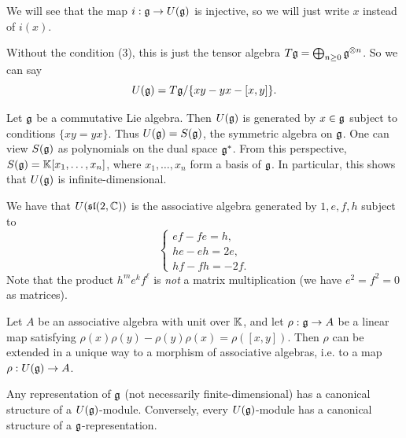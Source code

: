 \begin{remark}
  We will see that the map
  $i : \mathfrak{g} \to U(\mathfrak{g})$ is injective, so
  we will just write $x$ instead of $i(x)$.
\end{remark}

\begin{remark}
  Without the condition (3), this is just
  the tensor algebra
  $T \mathfrak{g} = \bigoplus_{n \ge 0} \mathfrak{g}^{\otimes n}$.
  So we can say
  \[
    U(\mathfrak{g}) = T \mathfrak{g} / \{xy - yx - [x, y]\}.
  \]
\end{remark}

\begin{example}
  Let $\mathfrak{g}$ be a commutative Lie algebra.
  Then $U(\mathfrak{g})$ is generated by $x \in \mathfrak{g}$
  subject to conditions
  $\{xy = yx\}$. Thus $U(\mathfrak{g}) = S(\mathfrak{g})$, the
  symmetric algebra on $\mathfrak{g}$. One can view $S(\mathfrak{g})$ as polynomials on the dual space $\mathfrak{g}^*$. From this perspective, $S(\mathfrak{g}) = \mathbb{K}[x_1, \dots, x_n]$, where $x_1, \dots, x_n$ form a basis of $\mathfrak{g}$.
  In particular, this shows that
  $U(\mathfrak{g})$ is infinite-dimensional.
\end{example}

\begin{example}
  We have that $U(\mathfrak{sl}(2, \mathbb{C}))$
  is the associative algebra generated
  by $1, e, f, h$ subject to
  \[
    \begin{cases}
      ef - fe = h, \\
      he - eh = 2e, \\
      hf - fh = -2f.
    \end{cases}
  \]
  Note that the product $h^m e^k f^\ell$
  is \emph{not} a matrix multiplication (we have
  $e^2 = f^2 = 0$ as matrices).
\end{example}

\begin{theorem}
  Let $A$ be an associative algebra with
  unit over $\mathbb{K}$, and let $\rho : \mathfrak{g} \to A$
  be a linear map satisfying
  $\rho(x) \rho(y) - \rho(y) \rho(x) = \rho([x, y])$.
  Then $\rho$ can be extended in a unique
  way to a morphism of associative algebras,
  i.e. to a map $\rho : U(\mathfrak{g}) \to A$.
\end{theorem}

\begin{corollary}
  Any representation of $\mathfrak{g}$ (not necessarily
  finite-dimensional) has a canonical
  structure of a $U(\mathfrak{g})$-module. Conversely,
  every $U(\mathfrak{g})$-module has a canonical
  structure of a $\mathfrak{g}$-representation.
\end{corollary}
